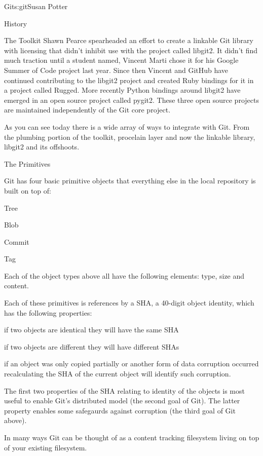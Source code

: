 \begin{aosachapter}{Git}{s:git}{Susan Potter}
\begin{aosasect1}{History}
\begin{aosasect1}{The Toolkit}
Shawn Pearce spearheaded an effort to create a linkable Git library with
licensing that didn't inhibit use with the project called libgit2. It didn't
find much traction until a student named, Vincent Marti chose it for his
Google Summer of Code project last year. Since then Vincent and GitHub have
continued contributing to the libgit2 project and created Ruby bindings
for it in a project called Rugged. More recently Python bindings around
libgit2 have emerged in an open source project called pygit2. These three
open source projects are maintained independently of the Git core project.

As you can see today there is a wide array of ways to integrate with Git.
From the plumbing portion of the toolkit, procelain layer and now the
linkable library, libgit2 and its offshoots.

\begin{aosasect1}{The Primitives}

Git has four basic primitive objects that everything else in the local
repository is built on top of:
\begin{aosaitemize}
  \item Tree
  \item Blob
  \item Commit
  \item Tag
\end{aosaitemize}

Each of the object types above all have the following elements: type, size and
content.

Each of these primitives is references by a SHA, a 40-digit object identity,
which has the following properties:
\begin{aosaitemize}
  \item if two objects are identical they will have the same SHA
  \item if two objects are different they will have different SHAs
  \item if an object was only copied partially or another form of data
        corruption occurred recalculating the SHA of the current object
        will identify such corruption.
\end{aosaitemize}

The first two properties of the SHA relating to identity of the objects is
most useful to enable Git's distributed model (the second goal of Git).
The latter property enables some safegaurds against corruption (the third goal
of Git above).

In many ways Git can be thought of as a content tracking filesystem living on top
of your existing filesystem.



\end{aosasect1}
\end{aosasect1}
\end{aosasect1}
\end{aosachapter}
